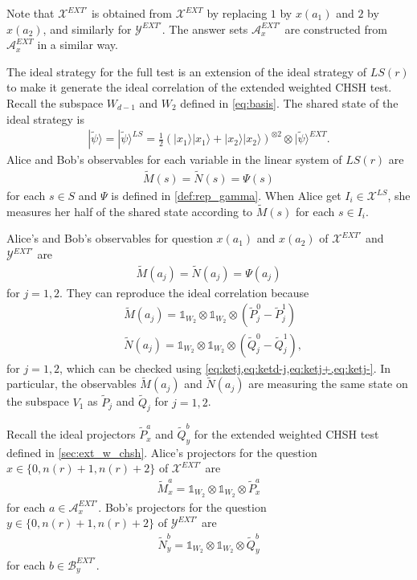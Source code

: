 \documentclass[11pt,letterpaper]{article}
\newcommand{\ket}[1]{|#1\rangle}
\newcommand{\x}{\otimes}
\newcommand{\calX}{\mathcal{X}}
\newcommand{\calY}{\mathcal{Y}}
\newcommand{\calA}{\mathcal{A}}
\newcommand{\calB}{\mathcal{B}}
\newcommand{\1}{\mathbb{1}}
\newcommand{\EXT}{EXT}
\newcommand{\LS}{LS}
\newcommand{\tP}{\tilde{P}}
\newcommand{\tQ}{\tilde{Q}}
\newcommand{\tM}{\tilde{M}}
\newcommand{\tN}{\tilde{N}}
\newcommand{\tpsi}{\tilde{\psi}}
\newcommand{\nr}{n(r)}
\theoremstyle{definition}
\begin{document}
Note that $\calX^{\EXT'}$ is obtained from $\calX^{\EXT}$ by replacing 
$1$ by $x(a_1)$ and $2$ by $x(a_2)$, and similarly for $\calY^{\EXT'}$.
The answer sets $\calA_x^{\EXT'}$ are constructed from $\calA_x^{\EXT}$
in a similar way.

The ideal strategy for the full test is an extension of the ideal strategy of $\LS(r)$ to make it generate the ideal correlation of 
the extended weighted CHSH test.
Recall the subspace $W_{d-1}$ and $W_2$ defined in \cref{eq:basis}.
The shared state of the ideal strategy is
\begin{align}
	\label{eq:tpsi_full}
    \ket{\tpsi} = \ket{\tpsi}^{\LS} = \frac{1}{2}(\ket{x_1}\ket{x_1} + 
    \ket{x_2}\ket{x_2})^{\x 2} \x \ket{\tpsi}^{\EXT}.
\end{align}
Alice and Bob's observables for each variable in the linear system of 
$\LS(r)$ are 
\begin{align*}
    \tM(s) = \tN(s) = \Psi(s) 
\end{align*}
for each $s \in S$ and $\Psi$ is defined in \cref{def:rep_gamma}.
When Alice get $I_i \in \calX^{\LS}$, she measures her half of the shared
state according to $\tM(s)$ for each $s \in I_i$.

Alice's and Bob's observables for question $x(a_1)$ and $x(a_2)$ of $\calX^{\EXT'}$ and $\calY^{\EXT'}$ are
\begin{align*}
    \tM(a_j) = \tN(a_j) = \Psi(a_j) 
\end{align*}
for $j= 1,2$.
They can reproduce the ideal correlation because
\begin{align*}
    & \tM(a_j)  = \1_{W_2} \x \1_{W_2} \x (\tP_j^0 - \tP_j^1) \\
    & \tN(a_j)  = \1_{W_2} \x \1_{W_2} \x (\tQ_j^0 - \tQ_j^1),
\end{align*}
for $j = 1,2$,
which can be checked using \cref{eq:ketj,eq:ketd-j,eq:ketj+,eq:ketj-}.
In particular, the observables $\tM(a_j)$ and $\tN(a_j)$ are 
measuring the same state on the subspace $V_1$ as $\tP_j$ and $\tQ_j$
for $j = 1,2$.

Recall the ideal projectors $\tP_x^a$ and $\tQ_y^b$ for the extended 
weighted CHSH test defined in \cref{sec:ext_w_chsh}.
Alice's projectors for the question $x \in \{0, \nr+1, \nr+2\}$ of $\calX^{\EXT'}$ are
\begin{align*}
    \tM_x^a = \1_{W_2} \x \1_{W_2} \x \tP_x^a
\end{align*}
for each $a \in \calA^{\EXT'}_x$.
Bob's projectors for the question $y \in \{0, \nr+1, \nr+2\}$ of $\calY^{\EXT'}$ are 
\begin{align*}
    \tN_y^b = \1_{W_2} \x \1_{W_2} \x \tQ_y^b
\end{align*}
for each $b \in \calB^{\EXT'}_y$.
\end{document}
